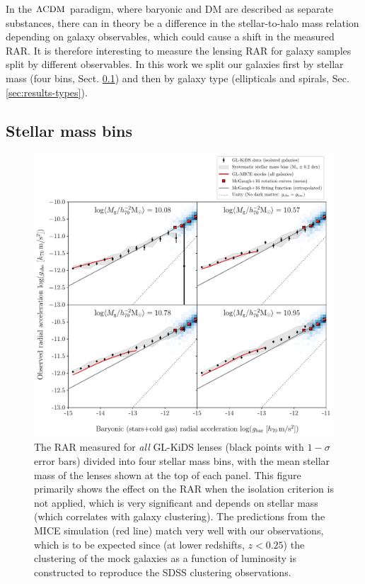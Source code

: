 \documentclass[usenatbib]{mnras}
\newcommand{\lcdm}{{\rm \Lambda CDM}}
\begin{document}
In the $\lcdm$ paradigm, where baryonic and DM are described as separate substances, there can in theory be a difference in the stellar-to-halo mass relation depending on galaxy observables, which could cause a shift in the measured RAR. It is therefore interesting to measure the lensing RAR for galaxy samples split by different observables. In this work we split our galaxies first by stellar mass (four bins, Sect. \ref{sec:results_Mstarbins}) and then by galaxy type (ellipticals and spirals, Sec. \ref{sec:results-types}).

\subsection{Stellar mass bins}
\label{sec:results_Mstarbins}

\begin{figure}
	\includegraphics[width=\textwidth]{Figures/RAR_KiDS+MICE_4-massbins_all.pdf}
	\caption{The RAR measured for \emph{all} GL-KiDS lenses (black points with $1-\sigma$ error bars) divided into four stellar mass bins, with the mean stellar mass of the lenses shown at the top of each panel. This figure primarily shows the effect on the RAR when the isolation criterion is not applied, which is very significant and depends on stellar mass (which correlates with galaxy clustering). The predictions from the MICE simulation (red line) match very well with our observations, which is to be expected since (at lower redshifts, $z<0.25$) the clustering of the mock galaxies as a function of luminosity is constructed to reproduce the SDSS clustering observations.}
	\label{fig:RAR_kids_mice_mstarbins_all}
\end{figure}
\end{document}
